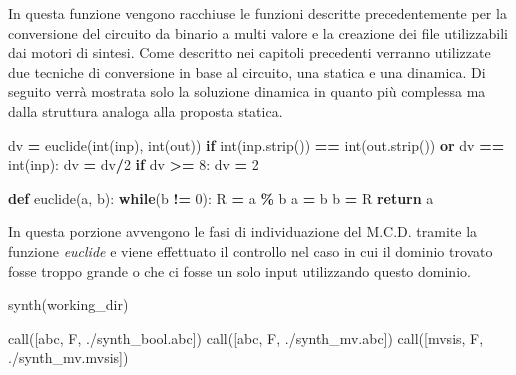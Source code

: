 \documentclass[
  italian,
]{book}
\newenvironment{Shaded}{\begin{snugshade}}{\end{snugshade}}
\newcommand{\BuiltInTok}[1]{#1}
\newcommand{\ControlFlowTok}[1]{\textcolor[rgb]{0.13,0.29,0.53}{\textbf{#1}}}
\newcommand{\DecValTok}[1]{\textcolor[rgb]{0.00,0.00,0.81}{#1}}
\newcommand{\KeywordTok}[1]{\textcolor[rgb]{0.13,0.29,0.53}{\textbf{#1}}}
\newcommand{\NormalTok}[1]{#1}
\newcommand{\OperatorTok}[1]{\textcolor[rgb]{0.81,0.36,0.00}{\textbf{#1}}}
\newcommand{\StringTok}[1]{\textcolor[rgb]{0.31,0.60,0.02}{#1}}
\begin{document}
In questa funzione vengono racchiuse le funzioni descritte precedentemente per la conversione del circuito da binario a multi valore e la creazione dei file utilizzabili dai motori di sintesi. Come descritto nei capitoli precedenti verranno utilizzate due tecniche di conversione in base al circuito, una statica e una dinamica. Di seguito verrà mostrata solo la soluzione dinamica in quanto più complessa ma dalla struttura analoga alla proposta statica.

\newpage

\begin{Shaded}
\begin{Highlighting}[]
\NormalTok{dv }\OperatorTok{=}\NormalTok{ euclide(}\BuiltInTok{int}\NormalTok{(inp), }\BuiltInTok{int}\NormalTok{(out))}
  \ControlFlowTok{if} \BuiltInTok{int}\NormalTok{(inp.strip()) }\OperatorTok{==} \BuiltInTok{int}\NormalTok{(out.strip())}
    \KeywordTok{or}\NormalTok{ dv }\OperatorTok{==} \BuiltInTok{int}\NormalTok{(inp):}
\NormalTok{    dv }\OperatorTok{=}\NormalTok{ dv}\OperatorTok{/}\DecValTok{2}
  \ControlFlowTok{if}\NormalTok{ dv }\OperatorTok{\textgreater{}=} \DecValTok{8}\NormalTok{:}
\NormalTok{    dv }\OperatorTok{=} \DecValTok{2} 

\KeywordTok{def}\NormalTok{ euclide(a, b):}
  \ControlFlowTok{while}\NormalTok{(b }\OperatorTok{!=} \DecValTok{0}\NormalTok{):}
\NormalTok{    R }\OperatorTok{=}\NormalTok{ a }\OperatorTok{\%}\NormalTok{ b}
\NormalTok{    a }\OperatorTok{=}\NormalTok{ b}
\NormalTok{    b }\OperatorTok{=}\NormalTok{ R}
  \ControlFlowTok{return}\NormalTok{ a}
\end{Highlighting}
\end{Shaded}

In questa porzione avvengono le fasi di individuazione del M.C.D. tramite la funzione \emph{euclide} e viene effettuato il controllo nel caso in cui il dominio trovato fosse troppo grande o che ci fosse un solo input utilizzando questo dominio.

\begin{Shaded}
\begin{Highlighting}[]
\NormalTok{synth(working\_dir)}

\NormalTok{call([}\StringTok{\textquotesingle{}abc\textquotesingle{}}\NormalTok{, }\StringTok{\textquotesingle{}{-}F\textquotesingle{}}\NormalTok{, }\StringTok{\textquotesingle{}./synth\_bool.abc\textquotesingle{}}\NormalTok{])}
\NormalTok{call([}\StringTok{\textquotesingle{}abc\textquotesingle{}}\NormalTok{, }\StringTok{\textquotesingle{}{-}F\textquotesingle{}}\NormalTok{, }\StringTok{\textquotesingle{}./synth\_mv.abc\textquotesingle{}}\NormalTok{])}
\NormalTok{call([}\StringTok{\textquotesingle{}mvsis\textquotesingle{}}\NormalTok{, }\StringTok{\textquotesingle{}{-}F\textquotesingle{}}\NormalTok{, }\StringTok{\textquotesingle{}./synth\_mv.mvsis\textquotesingle{}}\NormalTok{])}
\end{Highlighting}
\end{Shaded}
\end{document}
